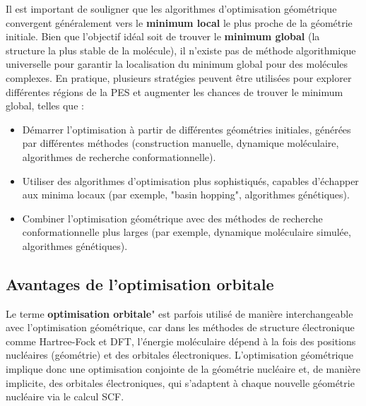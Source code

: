 \documentclass[12pt,a4paper]{article} %
\numberwithin{equation}{section} %
\numberwithin{figure}{section} %
\numberwithin{table}{section} %
\begin{document}
Il est important de souligner que les algorithmes d'optimisation géométrique convergent généralement vers le \textbf{minimum local} le plus proche de la géométrie initiale. Bien que l'objectif idéal soit de trouver le \textbf{minimum global} (la structure la plus stable de la molécule), il n'existe pas de méthode algorithmique universelle pour garantir la localisation du minimum global pour des molécules complexes. En pratique, plusieurs stratégies peuvent être utilisées pour explorer différentes régions de la PES et augmenter les chances de trouver le minimum global, telles que :

\begin{itemize}
 \item Démarrer l'optimisation à partir de différentes géométries initiales, générées par différentes méthodes (construction manuelle, dynamique moléculaire, algorithmes de recherche conformationnelle).
 \item Utiliser des algorithmes d'optimisation plus sophistiqués, capables d'échapper aux minima locaux (par exemple, "basin hopping", algorithmes génétiques).
 \item Combiner l'optimisation géométrique avec des méthodes de recherche conformationnelle plus larges (par exemple, dynamique moléculaire simulée, algorithmes génétiques).
\end{itemize}

\subsection{Avantages de l'optimisation orbitale}

Le terme \textbf{optimisation orbitale}" est parfois utilisé de manière interchangeable avec l'optimisation géométrique, car dans les méthodes de structure électronique comme Hartree-Fock et DFT, l'énergie moléculaire dépend à la fois des positions nucléaires (géométrie) et des orbitales électroniques. L'optimisation géométrique implique donc une optimisation conjointe de la géométrie nucléaire et, de manière implicite, des orbitales électroniques, qui s'adaptent à chaque nouvelle géométrie nucléaire via le calcul SCF.
\end{document}

